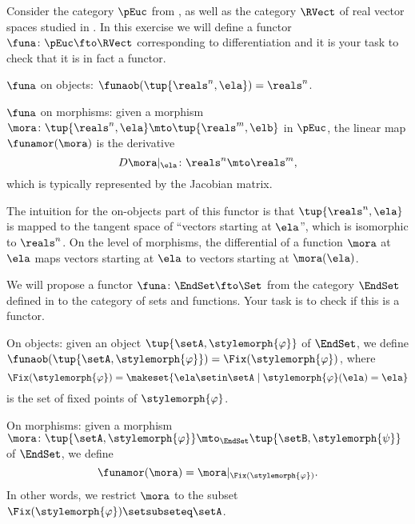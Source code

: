 \begin{gradedexercise}
    \label{ex:DifferentiationFunctor}

    Consider the category $\pEuc$ from , as well as the category $\RVect$ of real vector spaces studied in .
    In this exercise we will define a functor $\funa \colon \pEuc \fto \RVect$ corresponding to differentiation and it is your task to check that it is in fact a functor.

    $\funa$ on objects: $\funaob (\tup{\reals^n, \ela}) = \reals^n$.

    $\funa$ on morphisms: given a morphism $\mora \colon \tup{\reals^n, \ela} \mto \tup{\reals^m, \elb}$ in $\pEuc$, the linear map $\funamor(\mora)$ is the derivative
    \begin{equation}
        D \mora \vert_\ela \colon \reals^n \mto \reals^m,
    \end{equation}
    which is typically represented by the Jacobian matrix.

    The intuition for the on-objects part of this functor is that $\tup{\reals^n, \ela}$ is mapped to the tangent space of ``vectors starting at $\ela$'', which is isomorphic to $\reals^n$.
    On the level of morphisms, the differential of a function $\mora$ at $\ela$ maps vectors starting at $\ela$ to vectors starting at $\mora(\ela)$.

\end{gradedexercise}


\begin{gradedexercise}
    \label{ex:fixed-point-functor}

    We will propose a functor $\funa \colon \EndSet \fto \Set$ from the category $\EndSet$ defined in  to the category of sets and functions.
    Your task is to check if this is a functor.

    On objects: given an object $\tup{\setA, \stylemorph{\varphi}}$ of $\EndSet$, we define $\funaob( \tup{\setA, \stylemorph{\varphi}}) = \Fix(\stylemorph{\varphi})$, where
    \begin{equation}
        \Fix(\stylemorph{\varphi}) = \makeset{\ela \setin \setA \mid \stylemorph{\varphi}(\ela) = \ela}
    \end{equation}
    is the set of fixed points of $\stylemorph{\varphi}$.

    On morphisms: given a morphism $\mora \colon \tup{\setA, \stylemorph{\varphi}} \mto_\EndSet \tup{\setB, \stylemorph{\psi}}$ of $\EndSet$, we define
    \begin{equation}
        \funamor(\mora) = \mora \vert_{\Fix(\stylemorph{\varphi})}.
    \end{equation}
    In other words, we restrict $\mora$ to the subset $\Fix(\stylemorph{\varphi}) \setsubseteq \setA$.

\end{gradedexercise}

